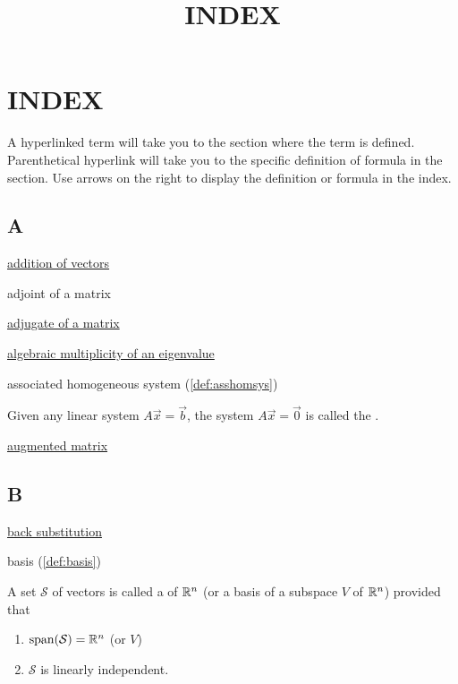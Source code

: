 \documentclass{ximera}
\title{INDEX} \license{CC BY-NC-SA 4.0}
\begin{document}
\begin{abstract}
\end{abstract}
\maketitle



\section{INDEX}
A hyperlinked term will take you to the section where the term is defined.  Parenthetical hyperlink will take you to the specific definition of formula in the section.  Use arrows on the right to display the definition or formula in the index.
\subsection{A}
\href{https://ximera.osu.edu/oerlinalg/LinearAlgebra/VEC-0030/main}{addition of vectors}

adjoint of a matrix

\href{https://ximera.osu.edu/oerlinalg/LinearAlgebra/DET-0060/main}{adjugate of a matrix}

\href{https://ximera.osu.edu/oerlinalg/LinearAlgebra/EIG-0020/main}{algebraic multiplicity of an eigenvalue}

associated homogeneous system (\ref{def:asshomsys})
\begin{expandable}
    Given any linear system $A\vec{x}=\vec{b}$, the system $A\vec{x}=\vec{0}$ is called the .
\end{expandable}

\href{https://ximera.osu.edu/oerlinalg/LinearAlgebra/SYS-0020/main}{augmented matrix}


\subsection{B}

\href{https://ximera.osu.edu/oerlinalg/LinearAlgebra/SYS-0020/main}{back substitution}

basis (\ref{def:basis})
\begin{expandable}
    A set $\mathcal{S}$ of vectors is called a  of $\mathbb{R}^n$ (or a basis of a subspace $V$ of $\mathbb{R}^n$) provided that 
\begin{enumerate}
\item \label{item:defbasis1}
$\mbox{span}(\mathcal{S})=\mathbb{R}^n$ (or $V$)
\item \label{item:defbasis2}
$\mathcal{S}$ is linearly independent.
\end{enumerate}
\end{expandable}
\end{document}
